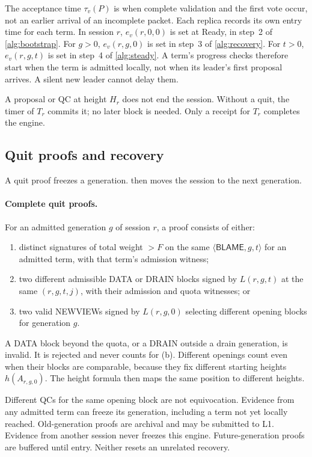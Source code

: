 \documentclass[11pt,a4paper]{article}
\newcommand{\RR}[1]{{\color{rrRed}#1}}
\newcommand{\tagg}[1]{\ensuremath{\mathsf{#1}}}
\begin{document}
The acceptance time $\tau_v(P)$ is when complete validation and the first
vote occur, not an earlier arrival of an incomplete packet. Each replica
records its own entry time for each term. In session $r$, $e_v(r,0,0)$ is
set at Ready, in step~2 of \cref{alg:bootstrap}. For $g>0$, $e_v(r,g,0)$ is
set in step~3 of \cref{alg:recovery}. For $t>0$, $e_v(r,g,t)$ is set in
step~4 of \cref{alg:steady}. A term's progress checks therefore start
when the term is admitted locally, not when its leader's first proposal
arrives. A silent new leader cannot delay them.

A proposal or QC at height $H_r$ does not end the session. Without a
quit, the timer of $T_r$ commits it; no later block is needed. Only a
receipt for $T_r$ completes the engine.

\subsection{Quit proofs and recovery}
\label{sec:quit}
A quit proof freezes a generation.  then moves the
session to the next generation.

\paragraph{Complete quit proofs.}
For an admitted generation $g$ \RR{of session $r$}, a proof consists of
either:
\begin{enumerate}[label=(\alph*)]
\item distinct signatures \RR{of total weight $>F$} on the same
$\langle\tagg{BLAME},g,t\rangle$ for an admitted term, with that term's
admission witness;
\item two different admissible DATA \RR{or DRAIN} blocks signed by
$L(r,g,t)$ at the same $(r,g,t,j)$, with their admission \RR{and quota}
witnesses; or
\item two valid NEWVIEWs signed by $L(r,g,0)$ selecting different opening
blocks for generation $g$.
\end{enumerate}
\RR{A DATA block beyond the quota, or a DRAIN outside a drain generation,
is invalid. It is rejected and never counts for (b).}
Different openings count even when their blocks are comparable, because
they fix different starting heights $h(A_{r,g,0})$. The height formula then
maps the same position to different heights.

Different QCs for the same opening block are not equivocation. Evidence
from any admitted term can freeze its generation, including a term not
yet locally reached. Old-generation proofs are archival and may be
submitted to L1. \RR{Evidence from another session never freezes this
engine.} Future-generation proofs are buffered until entry. Neither
resets an unrelated recovery.
\end{document}
